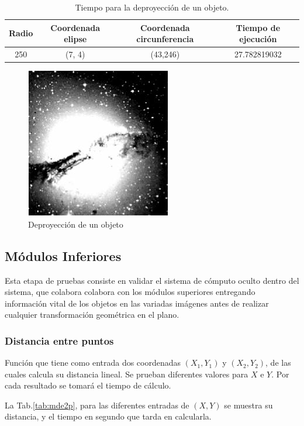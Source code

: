 \begin{table}[ht!]
	\centering
	\begin{tabular}{c|c|c|c}
		Radio & Coordenada elipse & Coordenada circunferencia & Tiempo de ejecución \\\hline\hline
		250 & (7, 4) & (43,246) & 27.782819032 \\
	\end{tabular}
	\caption{Tiempo para la deproyección de un objeto.}
	\label{tab:tpoDepro}
\end{table}

\begin{figure}[ht!]
	\centering
	\includegraphics[scale=1]{img/depro}
	\caption{Deproyección de un objeto}
	\label{img:depro}
\end{figure}

\subsection{Módulos Inferiores}

Esta etapa de pruebas consiste en validar el sistema de cómputo oculto dentro del sistema, que colabora colabora con los módulos superiores entregando información vital de los objetos en las variadas imágenes antes de realizar cualquier transformación geométrica en el plano.

\subsubsection{Distancia entre puntos}

Función que tiene como entrada dos coordenadas $(X_1 ,Y_1)$ y $(X_2 ,Y_2)$, de las cuales calcula su distancia lineal. Se prueban diferentes valores para $X$ e $Y$. Por cada resultado se tomará el tiempo de cálculo.

La Tab.\ref{tab:mde2p}, para las diferentes entradas de $(X,Y)$ se muestra su distancia, y el tiempo en segundo que tarda en calcularla.


